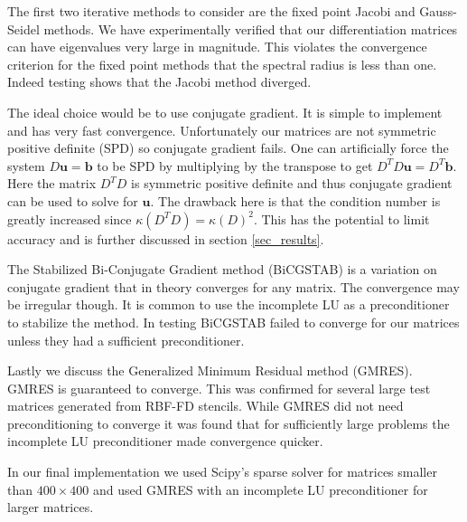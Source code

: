 \documentclass[12pt]{article}
\let\vec\mathbf
\begin{document}
	The first two iterative methods to consider are the fixed point Jacobi and Gauss-Seidel methods. We have experimentally verified that our differentiation matrices can have eigenvalues very large in magnitude. This violates the convergence criterion for the fixed point methods that the spectral radius is less than one. Indeed testing shows that the Jacobi method diverged. 
	
	The ideal choice would be to use conjugate gradient. It is simple to implement and has very fast convergence. Unfortunately our matrices are not symmetric positive definite (SPD) so conjugate gradient fails. One can artificially force the system $D\vec{u}=\vec{b}$ to be SPD by multiplying by the transpose to get $D^TD\vec{u} = D^T \vec{b}$. Here the matrix $D^TD$ is symmetric positive definite and thus conjugate gradient can be used to solve for $\vec{u}$. The drawback here is that the condition number is greatly increased since $\kappa(D^TD) = \kappa(D)^2$. This has the potential to limit accuracy and is further discussed in section \ref{sec_results}. 
	
	The Stabilized Bi-Conjugate Gradient method (BiCGSTAB) is a variation on conjugate gradient that in theory converges for any matrix. The convergence may be irregular though. It is common to use the incomplete LU as a preconditioner to stabilize the method. In testing BiCGSTAB failed to converge for our matrices unless they had a sufficient preconditioner. 
	
	Lastly we discuss the Generalized Minimum Residual method (GMRES). GMRES is guaranteed to converge. This was confirmed for several large test matrices generated from RBF-FD stencils. While GMRES did not need preconditioning to converge it was found that for sufficiently large problems the incomplete LU preconditioner made convergence quicker.
	
	In our final implementation we used Scipy's sparse solver for matrices smaller than $400 \times 400$ and used GMRES with an incomplete LU preconditioner for larger matrices.

\end{document}
